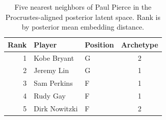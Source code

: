 \begin{table}[htbp]
  \centering\small
  \begin{tabular}{rllc}
    \toprule
    Rank & Player & Position & Archetype \\
    \midrule
    1 & Kobe Bryant & G & 2 \\
    2 & Jeremy Lin & G & 1 \\
    3 & Sam Perkins & F & 1 \\
    4 & Rudy Gay & F & 1 \\
    5 & Dirk Nowitzki & F & 2 \\
    \bottomrule
  \end{tabular}
  \caption{Five nearest neighbors of Paul Pierce in the Procrustes-aligned posterior latent space. Rank is by posterior mean embedding distance.}
  \label{tab:Paul_Pierce_neighbors}
\end{table}

